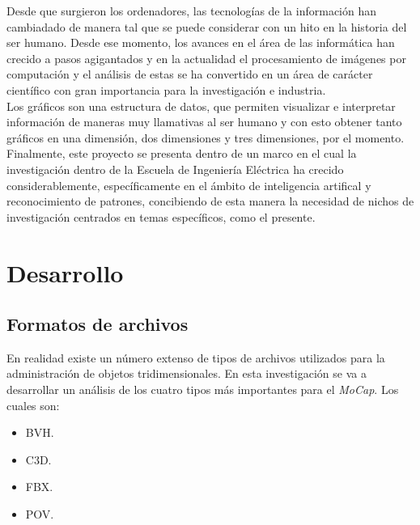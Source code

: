 \documentclass[11pt,letterpaper]{article}     %
\begin{document}
Desde que surgieron los ordenadores, las tecnolog\' ias de la informaci\' on han cambiadado de manera tal que se puede considerar con un hito en la historia del ser humano. Desde ese momento, los avances en el \' area de las inform\' atica han crecido a pasos agigantados y en la actualidad el procesamiento de im\' agenes por computaci\' on y el an\' alisis de estas se ha convertido en un \' area de car\' acter cient\' ifico con gran importancia para la investigaci\' on e industria.\\
Los gr\' aficos son una estructura de datos, que permiten visualizar e interpretar informaci\' on de maneras muy llamativas al ser humano y con esto obtener tanto gr\' aficos en una dimensi\' on, dos dimensiones y tres dimensiones, por el momento.\\
Finalmente, este proyecto se presenta dentro de un marco en el cual la investigaci\' on dentro de la Escuela de Ingenier\' ia El\' ectrica ha crecido considerablemente, espec\' ificamente en el \' ambito de inteligencia artifical y reconocimiento de patrones, concibiendo de esta manera la necesidad de nichos de investigaci\' on centrados en temas espec\' ificos, como el presente.


\section{Desarrollo}
\subsection{Formatos de archivos}
En realidad existe un n\' umero extenso de tipos de archivos utilizados para la administraci\' on de objetos tridimensionales. En esta investigaci\' on se va a desarrollar un an\'  alisis de los cuatro tipos m\' as importantes para el \textit{MoCap}. Los cuales son:
\begin{itemize}
\item BVH.
\item C3D.
\item FBX.
\item POV.
\end{itemize}
\end{document}
